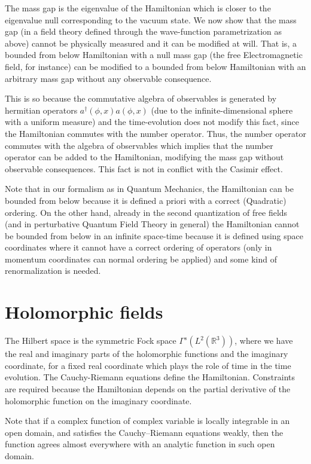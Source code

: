 \documentclass[11pt]{book}
\begin{document}
The mass gap is the eigenvalue of the Hamiltonian which is closer to the
eigenvalue null corresponding to the vacuum state. We now show that the
mass gap (in a field theory defined through the wave-function
parametrization as above) cannot be physically measured and it can be
modified at will. That is, a bounded from below Hamiltonian with a null
mass gap (the free Electromagnetic field, for instance) can be modified
to a bounded from below Hamiltonian with an arbitrary mass gap without
any observable consequence.

This is so because the commutative algebra of observables is generated
by hermitian operators \(a^\dagger(\phi,x)a(\phi,x)\) (due to the
infinite-dimensional sphere with a uniform measure) and the
time-evolution does not modify this fact, since the Hamiltonian commutes
with the number operator. Thus, the number operator commutes with the
algebra of observables which implies that the number operator can be
added to the Hamiltonian, modifying the mass gap without observable
consequences. This fact is not in conflict with the Casimir
effect\cite{Jaffe:2005vp}.

Note that in our formalism as in Quantum Mechanics, the Hamiltonian can
be bounded from below because it is defined a priori with a correct
(Quadratic) ordering. On the other hand, already in the second
quantization of free fields (and in perturbative Quantum Field Theory in
general) the Hamiltonian cannot be bounded from below in an infinite
space-time because it is defined using space coordinates where it cannot
have a correct ordering of
operators\cite{2006maph.conf..559F}
(only in momentum coordinates can normal ordering be applied) and some
kind of renormalization is needed.

\hypertarget{holomorphic-fields}{%
\section{Holomorphic fields}\label{holomorphic-fields}}

The Hilbert space is the symmetric Fock space
\(\Gamma^s(L^2(\mathbb{R}^{3}))\), where we have the real and imaginary
parts of the holomorphic functions and the imaginary coordinate, for a
fixed real coordinate which plays the role of time in the time
evolution. The Cauchy-Riemann equations define the Hamiltonian.
Constraints are required because the Hamiltonian depends on the partial
derivative of the holomorphic function on the imaginary coordinate.

Note that if a complex function of complex variable is locally
integrable in an open domain, and satisfies the Cauchy--Riemann
equations weakly, then the function agrees almost everywhere with an
analytic function in such open domain.
\end{document}
